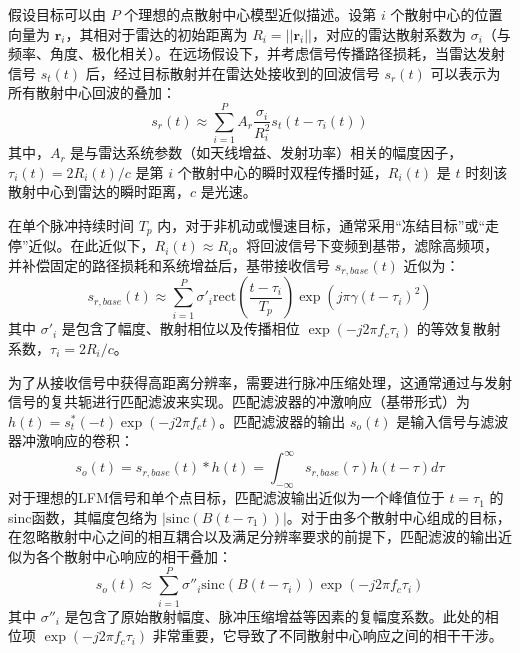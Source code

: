 假设目标可以由 $P$ 个理想的点散射中心模型近似描述。设第 $i$ 个散射中心的位置向量为 $\mathbf{r}_i$，其相对于雷达的初始距离为 $R_i = ||\mathbf{r}_i||$，对应的雷达散射系数为 $\sigma_i$（与频率、角度、极化相关）。在远场假设下，并考虑信号传播路径损耗，当雷达发射信号 $s_t(t)$ 后，经过目标散射并在雷达处接收到的回波信号 $s_r(t)$ 可以表示为所有散射中心回波的叠加：
\begin{equation}
    s_r(t) \approx \sum_{i=1}^{P} A_r \frac{\sigma_i}{R_i^2} s_t\left(t - \tau_i(t)\right)
    \label{eq:received_signal_sum_amplitude}
\end{equation}
其中，$A_r$ 是与雷达系统参数（如天线增益、发射功率）相关的幅度因子，$\tau_i(t) = 2 R_i(t) / c$ 是第 $i$ 个散射中心的瞬时双程传播时延，$R_i(t)$ 是 $t$ 时刻该散射中心到雷达的瞬时距离，$c$ 是光速。

在单个脉冲持续时间 $T_p$ 内，对于非机动或慢速目标，通常采用“冻结目标”或“走停”近似。在此近似下，$R_i(t) \approx R_i$。将回波信号下变频到基带，滤除高频项，并补偿固定的路径损耗和系统增益后，基带接收信号 $s_{r,base}(t)$ 近似为：
\begin{equation}
    s_{r,base}(t) \approx \sum_{i=1}^{P} \sigma'_i \text{rect}\left(\frac{t-\tau_i}{T_p}\right) \exp\left(j \pi \gamma (t-\tau_i)^2\right)
    \label{eq:received_baseband}
\end{equation}
其中 $\sigma'_i$ 是包含了幅度、散射相位以及传播相位 $\exp(-j 2\pi f_c \tau_i)$ 的等效复散射系数，$\tau_i = 2R_i/c$。

为了从接收信号中获得高距离分辨率，需要进行脉冲压缩处理，这通常通过与发射信号的复共轭进行匹配滤波来实现。匹配滤波器的冲激响应（基带形式）为 $h(t) = s_t^*(-t) \exp(-j 2\pi f_c t)$。匹配滤波器的输出 $s_o(t)$ 是输入信号与滤波器冲激响应的卷积：
\begin{equation}
    s_o(t) = s_{r,base}(t) * h(t) = \int_{-\infty}^{\infty} s_{r,base}(\tau) h(t-\tau) d\tau
    \label{eq:matched_filtering}
\end{equation}
对于理想的LFM信号和单个点目标，匹配滤波输出近似为一个峰值位于 $t = \tau_1$ 的sinc函数，其幅度包络为 $|\text{sinc}(B(t - \tau_1))|$。对于由多个散射中心组成的目标，在忽略散射中心之间的相互耦合以及满足分辨率要求的前提下，匹配滤波的输出近似为各个散射中心响应的相干叠加：
\begin{equation}
    s_o(t) \approx \sum_{i=1}^{P} \sigma''_i \text{sinc}\left(B(t - \tau_i)\right) \exp(-j 2\pi f_c \tau_i)
    \label{eq:pulse_compression_output_phase}
\end{equation}
其中 $\sigma''_i$ 是包含了原始散射幅度、脉冲压缩增益等因素的复幅度系数。此处的相位项 $\exp(-j 2\pi f_c \tau_i)$ 非常重要，它导致了不同散射中心响应之间的相干干涉。

